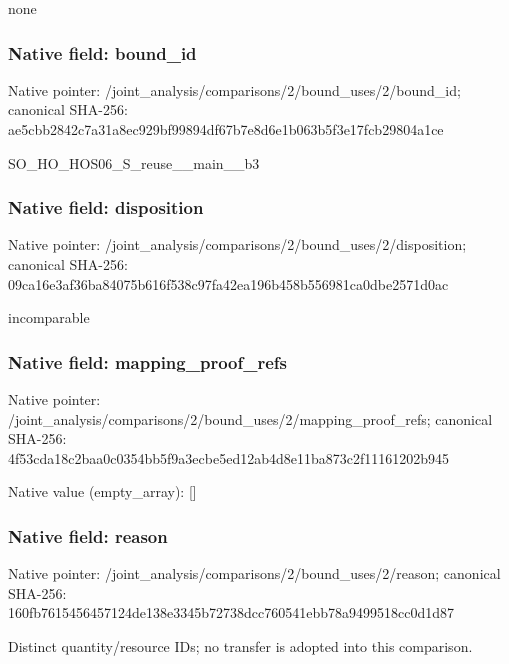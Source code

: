 \documentclass[10pt,a4paper]{article}
\begin{document}
\begingroup\raggedright\sloppy none\par\endgroup

\subsubsection{Native field: bound\_\allowbreak{}id}
Native pointer: /joint\_\allowbreak{}analysis/comparisons/2/bound\_\allowbreak{}uses/2/bound\_\allowbreak{}id; canonical SHA-256: ae5cbb2842c7a31a8ec929bf99894df67b7e8d6e1b063b5f3e17fcb29804a1ce

\begingroup\raggedright\sloppy SO\_\allowbreak{}HO\_\allowbreak{}HOS06\_\allowbreak{}S\_\allowbreak{}reuse\_\allowbreak{}\_\allowbreak{}main\_\allowbreak{}\_\allowbreak{}b3\par\endgroup

\subsubsection{Native field: disposition}
Native pointer: /joint\_\allowbreak{}analysis/comparisons/2/bound\_\allowbreak{}uses/2/disposition; canonical SHA-256: 09ca16e3af36ba84075b616f538c97fa42ea196b458b556981ca0dbe2571d0ac

\begingroup\raggedright\sloppy incomparable\par\endgroup

\subsubsection{Native field: mapping\_\allowbreak{}proof\_\allowbreak{}refs}
Native pointer: /joint\_\allowbreak{}analysis/comparisons/2/bound\_\allowbreak{}uses/2/mapping\_\allowbreak{}proof\_\allowbreak{}refs; canonical SHA-256: 4f53cda18c2baa0c0354bb5f9a3ecbe5ed12ab4d8e11ba873c2f11161202b945

Native value (empty\_\allowbreak{}array): []

\subsubsection{Native field: reason}
Native pointer: /joint\_\allowbreak{}analysis/comparisons/2/bound\_\allowbreak{}uses/2/reason; canonical SHA-256: 160fb7615456457124de138e3345b72738dcc760541ebb78a9499518cc0d1d87

\begingroup\raggedright\sloppy Distinct quantity/\allowbreak{}resource IDs;\allowbreak{} no transfer is adopted into this comparison.\par\endgroup
\end{document}
